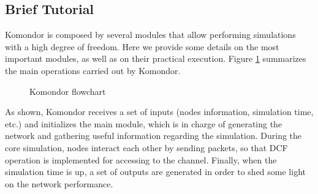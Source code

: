 \documentclass[a4paper]{article}
\begin{document}
	\subsection{Brief Tutorial}
	\label{section:brief_tutorial}
		Komondor is composed by several modules that allow performing simulations with a high degree of freedom. Here we provide some details on the most important modules, as well as on their practical execution. Figure \ref{fig:komondor_flowchart} summarizes the main operations carried out by Komondor.
		\begin{figure}[h!]
			\centering
			\caption{Komondor flowchart}
			\label{fig:komondor_flowchart}
		\end{figure}		
		
		As shown, Komondor receives a set of inputs (nodes information, simulation time, etc.) and initializes the main module, which is in charge of generating the network and gathering useful information regarding the simulation. During the core simulation, nodes interact each other by sending packets, so that DCF operation is implemented for accessing to the channel. Finally, when the simulation time is up, a set of outputs are generated in order to shed some light on the network performance.
		
\end{document}
